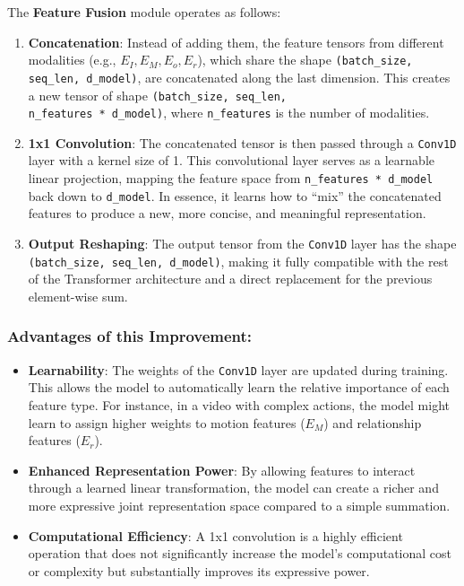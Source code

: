 The \textbf{Feature Fusion} module operates as follows:
\begin{enumerate}[nosep]
    \item \textbf{Concatenation}: Instead of adding them, the feature tensors from different modalities (e.g., $E_I, E_M, E_o, E_r$), which share the shape \texttt{(batch\_size, seq\_len, d\_model)}, are concatenated along the last dimension. This creates a new tensor of shape \texttt{(batch\_size, seq\_len,\\ n\_features * d\_model)}, where \texttt{n\_features} is the number of modalities.
    
    \item \textbf{1x1 Convolution}: The concatenated tensor is then passed through a \texttt{Conv1D} layer with a kernel size of 1. This convolutional layer serves as a learnable linear projection, mapping the feature space from \texttt{n\_features * d\_model} back down to \texttt{d\_model}. In essence, it learns how to ``mix'' the concatenated features to produce a new, more concise, and meaningful representation.
    
    \item \textbf{Output Reshaping}: The output tensor from the \texttt{Conv1D} layer has the shape \texttt{(batch\_size, seq\_len, d\_model)}, making it fully compatible with the rest of the Transformer architecture and a direct replacement for the previous element-wise sum.
\end{enumerate}

\subsubsection*{Advantages of this Improvement:}
\begin{itemize}[nosep]
    \item \textbf{Learnability}: The weights of the \texttt{Conv1D} layer are updated during training. This allows the model to automatically learn the relative importance of each feature type. For instance, in a video with complex actions, the model might learn to assign higher weights to motion features ($E_M$) and relationship features ($E_r$).
    
    \item \textbf{Enhanced Representation Power}: By allowing features to interact through a learned linear transformation, the model can create a richer and more expressive joint representation space compared to a simple summation.
    
    \item \textbf{Computational Efficiency}: A 1x1 convolution is a highly efficient operation that does not significantly increase the model's computational cost or complexity but substantially improves its expressive power.
\end{itemize}

